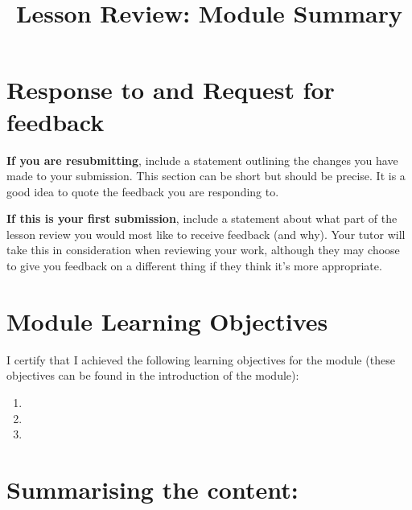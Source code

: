 \documentclass[
  12pt,
  a4paper,
]{scrartcl}
\title{\fontsize{50pt}{60pt}\selectfont Lesson Review: Module Summary}
\author{}
\date{}
\providecommand{\tightlist}{%
  \setlength{\itemsep}{0pt}\setlength{\parskip}{0pt}}
\begin{document}
\maketitle

\section{Response to and Request for
feedback}\label{response-to-and-request-for-feedback}

\textbf{If you are resubmitting}, include a statement outlining the
changes you have made to your submission. This section can be short but
should be precise. It is a good idea to quote the feedback you are
responding to.

\textbf{If this is your first submission}, include a statement about
what part of the lesson review you would most like to receive feedback
(and why). Your tutor will take this in consideration when reviewing
your work, although they may choose to give you feedback on a different
thing if they think it's more appropriate.

\section{Module Learning Objectives}\label{module-learning-objectives}

I certify that I achieved the following learning objectives for the
module (these objectives can be found in the introduction of the
module):

\begin{enumerate}
\def\labelenumi{\arabic{enumi}.}
\tightlist
\item
\item
\item
\end{enumerate}

\section{Summarising the content:}\label{summarising-the-content}
\end{document}
